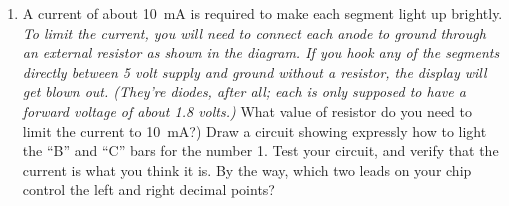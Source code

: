 \begin{enumerate}[wide]
\item A current of about 10~mA is required to make each segment light up brightly.  \textit{To limit the current, you will need to connect each anode to ground through an external resistor as shown in the diagram.  If you hook any of the segments directly between 5 volt supply and ground without a resistor, the display will get blown out.  (They're diodes, after all; each is only supposed to have a forward voltage of about 1.8 volts.)}  What value of resistor do you need to limit the current to 10~mA?)  Draw a circuit showing expressly how to light the ``B'' and ``C'' bars for the number 1.  Test your circuit, and verify that the current is what you think it is.  By the way, which two leads on your chip control the left and right decimal points? \label{part_man72_connections}

\end{enumerate}
